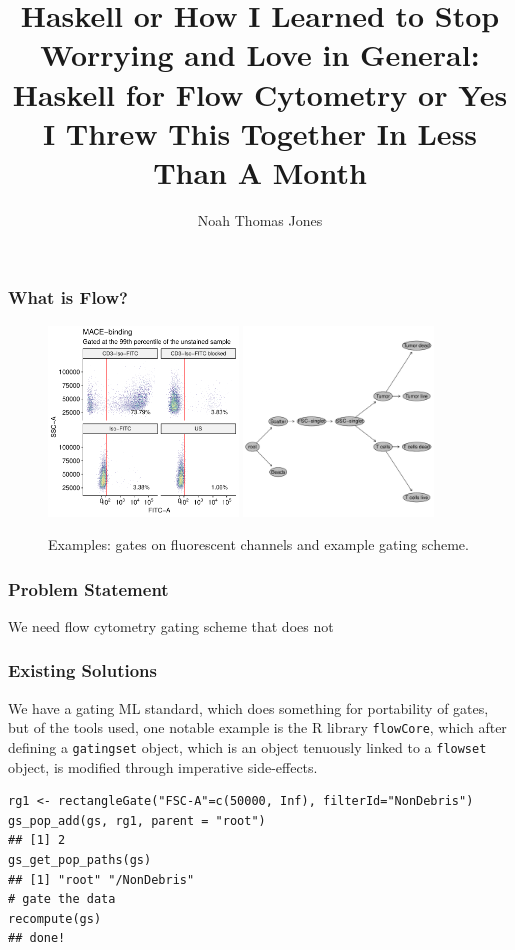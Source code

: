 \documentclass{beamer}
\title{Haskell or How I Learned to Stop Worrying and Love in General: Haskell for Flow Cytometry or Yes I Threw This Together In Less Than A Month}
\author{Noah Thomas Jones}
\institute{University of Florida}
\date{}
\begin{document}
\frame{\titlepage}
\begin{frame}
  \frametitle{What is Flow?}
  \begin{figure}
    \centering
    \includegraphics[width=0.45\textwidth]{./images/NJ030_MACE-binding.pdf}
    \includegraphics[width=0.45\textwidth]{./images/NJ017_gates.pdf}
    \caption{Examples: gates on fluorescent channels and
      example gating scheme.}
  \end{figure}
\end{frame}
\begin{frame}
  \frametitle{Problem Statement}
  We need flow cytometry gating scheme that does not
\end{frame}
\begin{frame}[fragile]
  \frametitle{Existing Solutions} We have a gating ML
  standard\cite{spidlen2015isac}, which does something for portability
  of gates, but of the tools used, one notable example is the R
  library \texttt{flowCore}, which after defining a \texttt{gatingset} object,
  which is an object tenuously linked to a \texttt{flowset} object, is
  modified through imperative side-effects.
\begin{lstlisting}
rg1 <- rectangleGate("FSC-A"=c(50000, Inf), filterId="NonDebris")
gs_pop_add(gs, rg1, parent = "root")
## [1] 2
gs_get_pop_paths(gs)
## [1] "root" "/NonDebris"
# gate the data
recompute(gs)
## done!
\end{lstlisting}
\end{frame}
\end{document}
